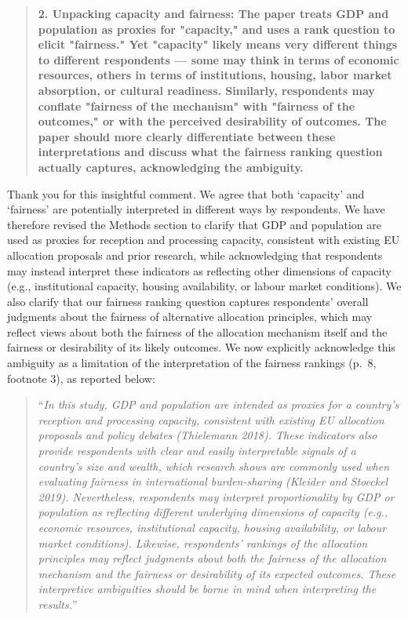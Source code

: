 \documentclass[
  11pt,
]{article}
\begin{document}
\begin{quote}
\textbf{2. Unpacking \textquotesingle capacity\textquotesingle{} and \textquotesingle fairness\textquotesingle: The paper treats GDP and population as proxies for "capacity," and uses a rank question to elicit "fairness." Yet "capacity" likely means very different things to different respondents --- some may think in terms of economic resources, others in terms of institutions, housing, labor market absorption, or cultural readiness. Similarly, respondents may conflate "fairness of the mechanism" with "fairness of the outcomes," or with the perceived desirability of outcomes. The paper should more clearly differentiate between these interpretations and discuss what the fairness ranking question actually captures, acknowledging the ambiguity.}
\end{quote}

Thank you for this insightful comment. We agree that both `capacity' and `fairness' are potentially interpreted in different ways by respondents. We have therefore revised the Methods section to clarify that GDP and population are used as proxies for reception and processing capacity, consistent with existing EU allocation proposals and prior research, while acknowledging that respondents may instead interpret these indicators as reflecting other dimensions of capacity (e.g., institutional capacity, housing availability, or labour market conditions). We also clarify that our fairness ranking question captures respondents' overall judgments about the fairness of alternative allocation principles, which may reflect views about both the fairness of the allocation mechanism itself and the fairness or desirability of its likely outcomes. We now explicitly acknowledge this ambiguity as a limitation of the interpretation of the fairness rankings (p.~8, footnote 3), as reported below:

\begin{quote}
``\emph{In this study, GDP and population are intended as proxies for a country's reception and processing capacity, consistent with existing EU allocation proposals and policy debates (Thielemann 2018). These indicators also provide respondents with clear and easily interpretable signals of a country's size and wealth, which research shows are commonly used when evaluating fairness in international burden-sharing (Kleider and Stoeckel 2019). Nevertheless, respondents may interpret proportionality by GDP or population as reflecting different underlying dimensions of capacity (e.g., economic resources, institutional capacity, housing availability, or labour market conditions). Likewise, respondents' rankings of the allocation principles may reflect judgments about both the fairness of the allocation mechanism and the fairness or desirability of its expected outcomes. These interpretive ambiguities should be borne in mind when interpreting the results.}''
\end{quote}
\end{document}
